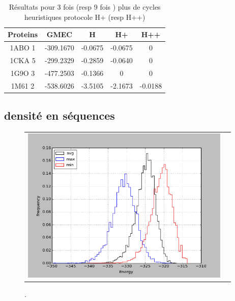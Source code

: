 \documentclass[a4paper,12pt]{article}
\begin{document}
    \begin{table}[h]
      \centering

      \begin{tabular}{|c|c|c|c|c|}

        \hline
        Proteins & GMEC & H & H+ & H++ \\
        \hline
        1ABO 1 & -309.1670 & -0.0675 & -0.0675 & 0 \\
        1CKA 5 & -299.2329 & -0.2859 & -0.0640 & 0 \\
        1G9O 3 & -477.2503 & -0.1366 & 0 & 0 \\
        1M61 2 & -538.6026 & -3.5105 & -2.1673 & -0.0188 \\
        \hline


 \end{tabular}      
 \caption{Résultats pour 3 fois (resp 9 fois ) plus de cycles heuristiques protocole H+ (resp H++)}
 \label{tab_echec2BYG__1}       
\end{table}



    \clearpage

    \clearpage

   \subsection{densité en séquences }



    \begin{figure}[h]
      \centering
      \begin{tabular}{cc} 
        \includegraphics[width=10cm]{graphe/histo1_aa_Tambiante.png} &
      \end{tabular}
      
      \caption{.}
      \label{temps_CPU}
    \end{figure}
\end{document}
